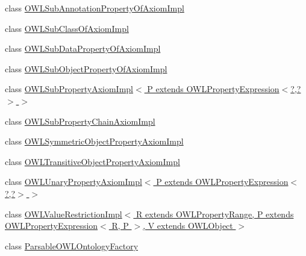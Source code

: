 \begin{DoxyCompactItemize}
\item 
class \hyperlink{classuk_1_1ac_1_1manchester_1_1cs_1_1owl_1_1owlapi_1_1_o_w_l_sub_annotation_property_of_axiom_impl}{O\-W\-L\-Sub\-Annotation\-Property\-Of\-Axiom\-Impl}
\item 
class \hyperlink{classuk_1_1ac_1_1manchester_1_1cs_1_1owl_1_1owlapi_1_1_o_w_l_sub_class_of_axiom_impl}{O\-W\-L\-Sub\-Class\-Of\-Axiom\-Impl}
\item 
class \hyperlink{classuk_1_1ac_1_1manchester_1_1cs_1_1owl_1_1owlapi_1_1_o_w_l_sub_data_property_of_axiom_impl}{O\-W\-L\-Sub\-Data\-Property\-Of\-Axiom\-Impl}
\item 
class \hyperlink{classuk_1_1ac_1_1manchester_1_1cs_1_1owl_1_1owlapi_1_1_o_w_l_sub_object_property_of_axiom_impl}{O\-W\-L\-Sub\-Object\-Property\-Of\-Axiom\-Impl}
\item 
class \hyperlink{classuk_1_1ac_1_1manchester_1_1cs_1_1owl_1_1owlapi_1_1_o_w_l_sub_property_axiom_impl_3_01_p_01ex22572232b03223b699ed74a4771c1e6d}{O\-W\-L\-Sub\-Property\-Axiom\-Impl$<$ P extends O\-W\-L\-Property\-Expression$<$?,?$>$ $>$}
\item 
class \hyperlink{classuk_1_1ac_1_1manchester_1_1cs_1_1owl_1_1owlapi_1_1_o_w_l_sub_property_chain_axiom_impl}{O\-W\-L\-Sub\-Property\-Chain\-Axiom\-Impl}
\item 
class \hyperlink{classuk_1_1ac_1_1manchester_1_1cs_1_1owl_1_1owlapi_1_1_o_w_l_symmetric_object_property_axiom_impl}{O\-W\-L\-Symmetric\-Object\-Property\-Axiom\-Impl}
\item 
class \hyperlink{classuk_1_1ac_1_1manchester_1_1cs_1_1owl_1_1owlapi_1_1_o_w_l_transitive_object_property_axiom_impl}{O\-W\-L\-Transitive\-Object\-Property\-Axiom\-Impl}
\item 
class \hyperlink{classuk_1_1ac_1_1manchester_1_1cs_1_1owl_1_1owlapi_1_1_o_w_l_unary_property_axiom_impl_3_01_p_01ef205cf0db3dbc15b2d1991298cd49c2}{O\-W\-L\-Unary\-Property\-Axiom\-Impl$<$ P extends O\-W\-L\-Property\-Expression$<$?,?$>$ $>$}
\item 
class \hyperlink{classuk_1_1ac_1_1manchester_1_1cs_1_1owl_1_1owlapi_1_1_o_w_l_value_restriction_impl_3_01_r_01extb41ab5275c9a4aea48395a608c721463}{O\-W\-L\-Value\-Restriction\-Impl$<$ R extends O\-W\-L\-Property\-Range, P extends O\-W\-L\-Property\-Expression$<$ R, P $>$, V extends O\-W\-L\-Object $>$}
\item 
class \hyperlink{classuk_1_1ac_1_1manchester_1_1cs_1_1owl_1_1owlapi_1_1_parsable_o_w_l_ontology_factory}{Parsable\-O\-W\-L\-Ontology\-Factory}
\item 

\end{DoxyCompactItemize}
